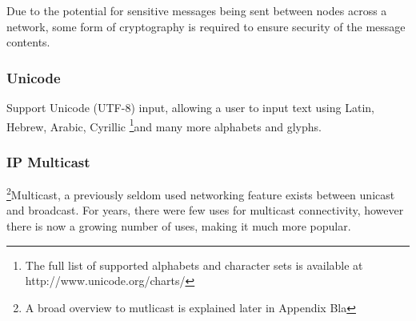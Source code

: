 Due to the potential for sensitive messages being sent between nodes
across a network, some form of cryptography is required to ensure 
security of the message contents.

\subsubsection{Unicode}

Support Unicode (UTF-8) input, allowing a user to input text using 
Latin, Hebrew, Arabic, Cyrillic
\footnote{The full list of supported alphabets and character sets is available at http://www.unicode.org/charts/}{and many more}
alphabets and glyphs. 

\subsubsection{IP Multicast}

\footnote{A broad overview to mutlicast is explained later in Appendix Bla}{Multicast}, 
a previously seldom used networking feature exists between unicast and 
broadcast. For years, there were few uses for multicast connectivity, 
however there is now a growing number of uses, making it much more 
popular. 

